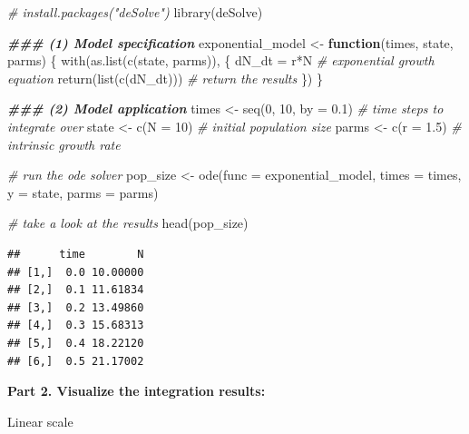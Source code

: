 \documentclass[
]{book}
\newenvironment{Shaded}{\begin{snugshade}}{\end{snugshade}}
\newcommand{\AttributeTok}[1]{\textcolor[rgb]{0.77,0.63,0.00}{#1}}
\newcommand{\CommentTok}[1]{\textcolor[rgb]{0.56,0.35,0.01}{\textit{#1}}}
\newcommand{\ControlFlowTok}[1]{\textcolor[rgb]{0.13,0.29,0.53}{\textbf{#1}}}
\newcommand{\DecValTok}[1]{\textcolor[rgb]{0.00,0.00,0.81}{#1}}
\newcommand{\DocumentationTok}[1]{\textcolor[rgb]{0.56,0.35,0.01}{\textbf{\textit{#1}}}}
\newcommand{\FloatTok}[1]{\textcolor[rgb]{0.00,0.00,0.81}{#1}}
\newcommand{\FunctionTok}[1]{\textcolor[rgb]{0.00,0.00,0.00}{#1}}
\newcommand{\NormalTok}[1]{#1}
\newcommand{\OtherTok}[1]{\textcolor[rgb]{0.56,0.35,0.01}{#1}}
\newcommand{\SpecialCharTok}[1]{\textcolor[rgb]{0.00,0.00,0.00}{#1}}
\begin{document}
\begin{Shaded}
\begin{Highlighting}[]
\CommentTok{\# install.packages("deSolve")}
\FunctionTok{library}\NormalTok{(deSolve)}

\DocumentationTok{\#\#\# (1) Model specification}
\NormalTok{exponential\_model }\OtherTok{\textless{}{-}} \ControlFlowTok{function}\NormalTok{(times, state, parms) \{}
  \FunctionTok{with}\NormalTok{(}\FunctionTok{as.list}\NormalTok{(}\FunctionTok{c}\NormalTok{(state, parms)), \{}
\NormalTok{    dN\_dt }\OtherTok{=}\NormalTok{ r}\SpecialCharTok{*}\NormalTok{N  }\CommentTok{\# exponential growth equation}
    \FunctionTok{return}\NormalTok{(}\FunctionTok{list}\NormalTok{(}\FunctionTok{c}\NormalTok{(dN\_dt)))  }\CommentTok{\# return the results  }
\NormalTok{  \})}
\NormalTok{\}}

\DocumentationTok{\#\#\# (2) Model application}
\NormalTok{times }\OtherTok{\textless{}{-}} \FunctionTok{seq}\NormalTok{(}\DecValTok{0}\NormalTok{, }\DecValTok{10}\NormalTok{, }\AttributeTok{by =} \FloatTok{0.1}\NormalTok{)  }\CommentTok{\# time steps to integrate over}
\NormalTok{state }\OtherTok{\textless{}{-}} \FunctionTok{c}\NormalTok{(}\AttributeTok{N =} \DecValTok{10}\NormalTok{)  }\CommentTok{\# initial population size}
\NormalTok{parms }\OtherTok{\textless{}{-}} \FunctionTok{c}\NormalTok{(}\AttributeTok{r =} \FloatTok{1.5}\NormalTok{)  }\CommentTok{\# intrinsic growth rate}

\CommentTok{\# run the ode solver}
\NormalTok{pop\_size }\OtherTok{\textless{}{-}} \FunctionTok{ode}\NormalTok{(}\AttributeTok{func =}\NormalTok{ exponential\_model, }\AttributeTok{times =}\NormalTok{ times, }\AttributeTok{y =}\NormalTok{ state, }\AttributeTok{parms =}\NormalTok{ parms)}

\CommentTok{\# take a look at the results}
\FunctionTok{head}\NormalTok{(pop\_size)}
\end{Highlighting}
\end{Shaded}

\begin{verbatim}
##      time        N
## [1,]  0.0 10.00000
## [2,]  0.1 11.61834
## [3,]  0.2 13.49860
## [4,]  0.3 15.68313
## [5,]  0.4 18.22120
## [6,]  0.5 21.17002
\end{verbatim}

\textbf{Part 2. Visualize the integration results:}

Linear scale
\end{document}
